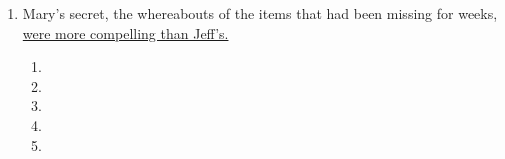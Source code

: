 \begin{enumerate}
\bigskip
\item Mary's secret, the whereabouts of the items that had been missing for weeks, \ul{were more compelling than Jeff's.}

\bigskip
\begin{enumerate}[label=(\Alph*)]

\item        \hrulefill
\item   \hrulefill
\item    \hrulefill
\item    \hrulefill
\item   \hrulefill
\end{enumerate}


\end{enumerate}
